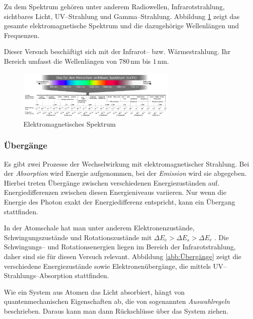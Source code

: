 \documentclass[12pt,a4paper]{scrartcl}
\numberwithin{equation}{section} %
\begin{document}
Zu dem Spektrum gehören unter anderem Radiowellen, Infrarotstrahlung, sichtbares Licht, UV--Strahlung und Gamma--Strahlung. Abbildung \ref{abb:EM Spektrum} zeigt das gesamte elektromagnetische Spektrum und die dazugehörige Wellenlängen und Frequenzen.

Dieser Versuch beschäftigt sich mit der Infrarot-- bzw. Wärmestrahlung. Ihr Bereich umfasst die Wellenlängen von $780\mathrm{\,nm}$ bis $1\mathrm{\,nm}$.

\begin{figure}[h!]
  \centering
  \includegraphics[width=0.7\textwidth]{../media/B1.1/EM_Spektrum.png}
  \caption{Elektromagnetisches Spektrum \cite{Wikipedia: Elektromagnetisches Spektrum}}
  \label{abb:EM Spektrum}
\end{figure}

\subsubsection{Übergänge}
\label{Übergänge}
Es gibt zwei Prozesse der Wechselwirkung mit elektromagnetischer Strahlung. Bei der \emph{Absorption} wird Energie aufgenommen, bei der \emph{Emission} wird sie abgegeben. Hierbei treten Übergänge zwischen verschiedenen Energiezuständen auf. Energiedifferenzen zwischen diesen Energieniveaus variieren. Nur wenn die Energie des Photon exakt der Energiedifferenz entspricht, kann ein Übergang stattfinden.

In der Atomschale hat man unter anderem Elektronenzustände, Schwingungszustände und Rotationszustände mit $\Delta E_{e} > \Delta E_{s} > \Delta E_{r}$ \cite{Agilent Technologies}. Die Schwingungs-- und Rotationsenergien liegen im Bereich der Infrarotstrahlung, daher sind sie für diesen Versuch relevant. Abbildung \ref{abb:Übergänge} zeigt die verschiedene Energiezustände sowie Elektronenübergänge, die mittels UV--Strahlungs--Absorption stattfinden.

Wie ein System aus Atomen das Licht absorbiert, hängt von quantenmechanischen Eigenschaften ab, die von sogenannten \emph{Auswahlregeln} beschrieben. Daraus kann man dann Rückschlüsse über das System ziehen.
\end{document}
